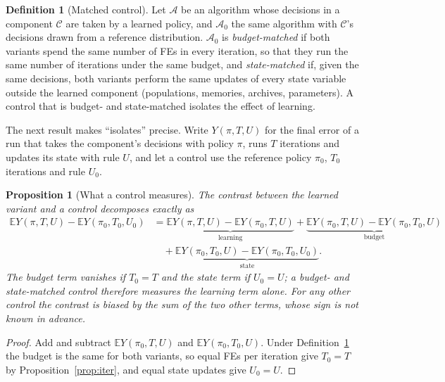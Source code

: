 \documentclass[11pt]{article}
\newtheorem{proposition}{Proposition}
\theoremstyle{definition}
\newtheorem{definition}{Definition}
\theoremstyle{remark}
\newcommand{\E}{\mathbb{E}}
\begin{document}
\begin{definition}[Matched control]
\label{def:matched}
Let $\mathcal A$ be an algorithm whose decisions in a component $\mathcal C$ are taken by a learned policy, and
$\mathcal A_0$ the same algorithm with $\mathcal C$'s decisions drawn from a reference distribution. $\mathcal A_0$ is
\emph{budget-matched} if both variants spend the same number of FEs in every iteration, so that they run the same number
of iterations under the same budget, and \emph{state-matched} if, given the same decisions, both variants perform the same
updates of every state variable outside the learned component (populations, memories, archives, parameters). A control
that is budget- and state-matched isolates the effect of learning.
\end{definition}

The next result makes ``isolates'' precise. Write $Y(\pi,T,U)$ for the final error of a run that takes the component's
decisions with policy $\pi$, runs $T$ iterations and updates its state with rule $U$, and let a control use the
reference policy $\pi_0$, $T_0$ iterations and rule $U_0$.

\begin{proposition}[What a control measures]
\label{prop:identify}
The contrast between the learned variant and a control decomposes exactly as
\begin{equation}
\begin{aligned}
\E Y(\pi,T,U)-\E Y(\pi_0,T_0,U_0)
&=\underbrace{\E Y(\pi,T,U)-\E Y(\pi_0,T,U)}_{\text{learning}}
+\underbrace{\E Y(\pi_0,T,U)-\E Y(\pi_0,T_0,U)}_{\text{budget}}\\
&\quad+\underbrace{\E Y(\pi_0,T_0,U)-\E Y(\pi_0,T_0,U_0)}_{\text{state}} .
\end{aligned}
\label{eq:identify}
\end{equation}
The budget term vanishes if $T_0=T$ and the state term if $U_0=U$; a budget- and state-matched control therefore
measures the learning term alone. For any other control the contrast is biased by the sum of the two other terms, whose
sign is not known in advance.
\end{proposition}
\begin{proof}
Add and subtract $\E Y(\pi_0,T,U)$ and $\E Y(\pi_0,T_0,U)$. Under Definition~\ref{def:matched} the budget is the same
for both variants, so equal FEs per iteration give $T_0=T$ by Proposition~\ref{prop:iter}, and equal state updates give
$U_0=U$.
\end{proof}
\end{document}
